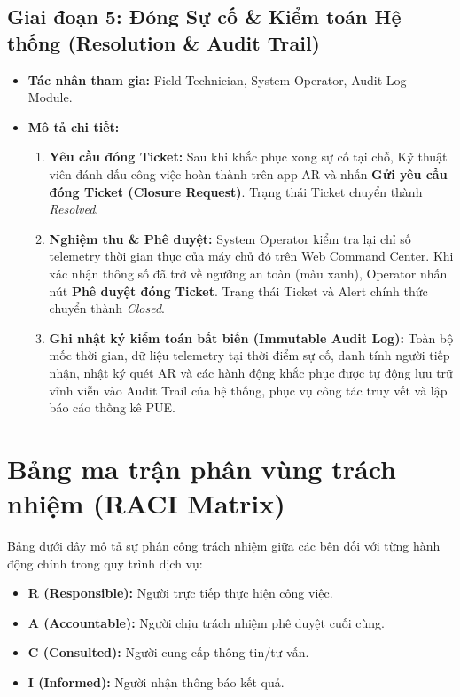 \subsection{Giai đoạn 5: Đóng Sự cố \& Kiểm toán Hệ thống (Resolution \& Audit Trail)}
\begin{itemize}
    \item \textbf{Tác nhân tham gia:} Field Technician, System Operator, Audit Log Module.
    \item \textbf{Mô tả chi tiết:}
    \begin{enumerate}
        \item \textbf{Yêu cầu đóng Ticket:} Sau khi khắc phục xong sự cố tại chỗ, Kỹ thuật viên đánh dấu công việc hoàn thành trên app AR và nhấn \textbf{Gửi yêu cầu đóng Ticket (Closure Request)}. Trạng thái Ticket chuyển thành \textit{Resolved}.
        \item \textbf{Nghiệm thu \& Phê duyệt:} System Operator kiểm tra lại chỉ số telemetry thời gian thực của máy chủ đó trên Web Command Center. Khi xác nhận thông số đã trở về ngưỡng an toàn (màu xanh), Operator nhấn nút \textbf{Phê duyệt đóng Ticket}. Trạng thái Ticket và Alert chính thức chuyển thành \textit{Closed}.
        \item \textbf{Ghi nhật ký kiểm toán bất biến (Immutable Audit Log):} Toàn bộ mốc thời gian, dữ liệu telemetry tại thời điểm sự cố, danh tính người tiếp nhận, nhật ký quét AR và các hành động khắc phục được tự động lưu trữ vĩnh viễn vào Audit Trail của hệ thống, phục vụ công tác truy vết và lập báo cáo thống kê PUE.
    \end{enumerate}
\end{itemize}

\section{Bảng ma trận phân vùng trách nhiệm (RACI Matrix)}
Bảng dưới đây mô tả sự phân công trách nhiệm giữa các bên đối với từng hành động chính trong quy trình dịch vụ:
\begin{itemize}
    \item \textbf{R (Responsible):} Người trực tiếp thực hiện công việc.
    \item \textbf{A (Accountable):} Người chịu trách nhiệm phê duyệt cuối cùng.
    \item \textbf{C (Consulted):} Người cung cấp thông tin/tư vấn.
    \item \textbf{I (Informed):} Người nhận thông báo kết quả.
\end{itemize}

